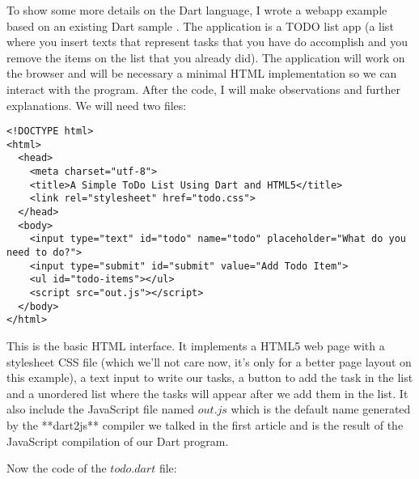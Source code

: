 To show some more details on the Dart language, I wrote a webapp example based
on an existing Dart sample \cite{4_1}. The
application is a TODO list app (a list where you insert texts that represent
tasks that you have do accomplish and you remove the items on the list that you
already did). The application will work on the browser and will be necessary a
minimal HTML \cite{4_2} implementation so we can
interact with the program. After the code, I will make observations and
further explanations. We will need two files:

\begin{verbatim}
<!DOCTYPE html>
<html>
  <head>
    <meta charset="utf-8">
    <title>A Simple ToDo List Using Dart and HTML5</title>
    <link rel="stylesheet" href="todo.css">
  </head>
  <body>
    <input type="text" id="todo" name="todo" placeholder="What do you need to do?">
    <input type="submit" id="submit" value="Add Todo Item">
    <ul id="todo-items"></ul>
    <script src="out.js"></script>
  </body>
</html>  
\end{verbatim}


This is the basic HTML interface. It implements a HTML5 web page with a
stylesheet \cite{4_3} CSS file (which we'll not care
now, it's only for a better page layout on this example), a text input to write
our tasks, a button to add the task in the list and a unordered list where the
tasks will appear after we add them in the list. It also include the JavaScript
file named $out.js$ which is the default name generated by the **dart2js**
compiler we talked in the first article and is the result of the JavaScript
compilation of our Dart program.

Now the code of the $todo.dart$ file:

